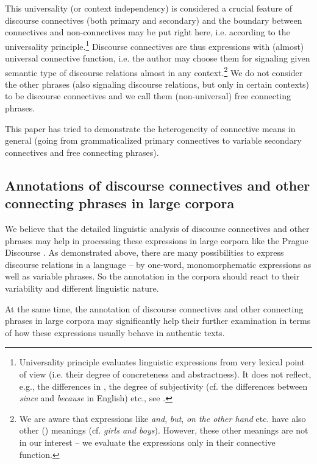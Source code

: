 \documentclass[output=paper]{langsci/langscibook.cls}
\begin{document}
This universality (or context independency) is considered a crucial feature of discourse connectives (both primary and secondary) and the boundary between connectives and non-connectives may be put right here, i.e. according to the universality principle.\footnote{Universality principle evaluates linguistic expressions from very lexical point of view (i.e. their degree of concreteness and abstractness). It does not reflect, e.g., the differences in , the degree of subjectivity (cf. the differences between \textit{since} and \textit{because} in English) etc., see \citealt{biblio:RyRySecondaryConnectives2015}.} Discourse connectives are thus expressions with (almost) universal connective function, i.e. the author may choose them for signaling given semantic type of discourse relations almost in any context.\footnote{ We are aware that expressions like \textit{and}, \textit{but}, \textit{on the other hand} etc. have also other () meanings (cf. \textit{girls and boys}). However, these other meanings are not in our interest – we evaluate the expressions only in their connective function.} We do not consider the other phrases (also signaling discourse relations, but only in certain contexts) to be discourse connectives and we call them (non-universal) free connecting phrases.


This paper has tried to demonstrate the heterogeneity of connective means in general (going from grammaticalized primary connectives to variable secondary connectives and free connecting phrases). 


\subsection{Annotations of discourse connectives and other connecting phrases in large corpora} %


We believe that the detailed linguistic analysis of discourse connectives and other phrases may help in processing these expressions in large corpora like the Prague Discourse . As demonstrated above, there are many possibilities to express discourse relations in a language – by one-word, monomorphematic expressions as well as variable  phrases. So the annotation in the corpora should react to their variability and different linguistic nature. 


At the same time, the annotation of discourse connectives and other connecting phrases in large corpora may significantly help their further examination in terms of how these expressions usually behave in authentic texts. 
\end{document}
